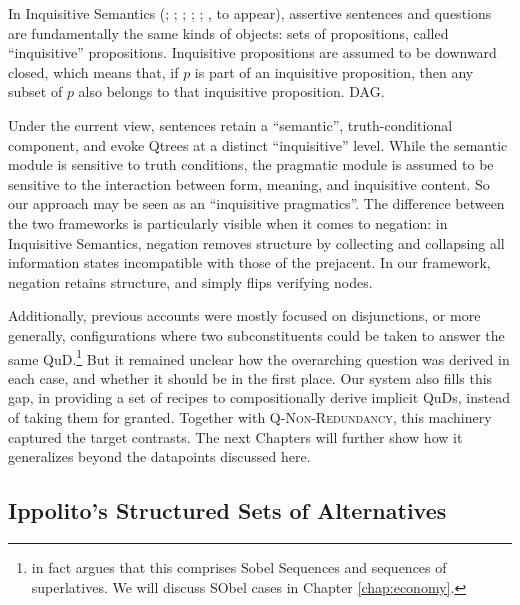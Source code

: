 In Inquisitive Semantics (; ; ; ; ; \citeauthor{Zhang2024}, to appear), assertive sentences and questions are fundamentally the same kinds of objects: sets of propositions, called ``inquisitive'' propositions. Inquisitive propositions are assumed to be downward closed, which means that, if $p$ is part of an inquisitive proposition, then any subset of $p$ also belongs to that inquisitive proposition. DAG.

Under the current view, sentences retain a ``semantic'', truth-conditional component, and evoke Qtrees at a distinct ``inquisitive'' level. While the semantic module is sensitive to truth conditions, the pragmatic module is assumed to be sensitive to the interaction between form, meaning, and inquisitive content. So our approach may be seen as an ``inquisitive pragmatics''. The difference between the two frameworks is particularly visible when it comes to negation: in Inquisitive Semantics, negation removes structure by collecting and collapsing all information states incompatible with those of the prejacent. In our framework, negation retains structure, and simply flips verifying nodes. 


Additionally, previous accounts were mostly focused on disjunctions, or more generally, configurations where two subconstituents could be taken to answer the same QuD.\footnote{\citet{Ippolito2019} in fact argues that this comprises Sobel Sequences and sequences of superlatives. We will discuss SObel cases in Chapter \ref{chap:economy}.} But it remained unclear how the overarching question was derived in each case, and whether it should be in the first place. Our system also fills this gap, in providing a set of recipes to compositionally derive implicit QuDs, instead of taking them for granted. Together with \textsc{Q-Non-Redundancy}, this machinery captured the target contrasts. The next Chapters will further show how it generalizes beyond the datapoints discussed here.\\






\subsection{Ippolito's Structured Sets of Alternatives}

